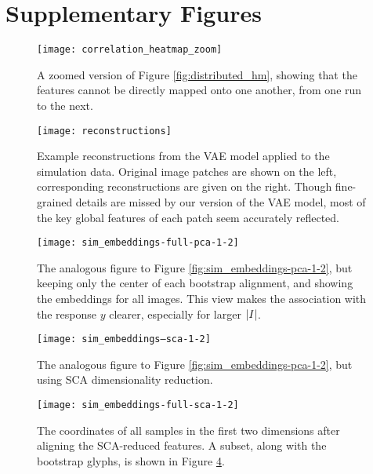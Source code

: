 \section{Supplementary Figures}

\begin{figure}
\texttt{[image: correlation\_heatmap\_zoom]}
\caption{A zoomed version of Figure \ref{fig:distributed_hm}, showing that the
  features cannot be directly mapped onto one another, from one run to the
  next.}
\label{fig:distributed_hm_subset}
\end{figure}

\begin{figure}
\texttt{[image: reconstructions]}
\caption{Example reconstructions from the VAE model applied to the simulation
  data. Original image patches are shown on the left, corresponding
  reconstructions are given on the right. Though fine-grained details are missed
  by our version of the VAE model, most of the key global features of each patch
  seem accurately reflected.}
\label{fig:reconstructions}
\end{figure}

\begin{figure}
  \centering
  \texttt{[image: sim\_embeddings-full-pca-1-2]}
  \caption{The analogous figure to Figure \ref{fig:sim_embeddings-pca-1-2}, but
    keeping only the center of each bootstrap alignment, and showing the
    embeddings for all images. This view makes the association with the response
    $y$ clearer, especially for larger $\left|I\right|$.}
  \label{fig:sim_embeddings-full-pca-1-2}
\end{figure}

\begin{figure}
  \centering
  \texttt{[image: sim\_embeddings--sca-1-2]}
  \caption{The analogous figure to Figure \ref{fig:sim_embeddings-pca-1-2}, but
    using SCA dimensionality reduction.}
  \label{fig:sim_embeddings--sca-1-2}
\end{figure}

\begin{figure}
  \centering
  \texttt{[image: sim\_embeddings-full-sca-1-2]}
  \caption{The coordinates of all samples in the first two dimensions after
    aligning the SCA-reduced features. A subset, along with the bootstrap
    glyphs, is shown in Figure \ref{fig:sim_embeddings--sca-1-2}.}
  \label{sim_embeddings-full-sca-1-2}
\end{figure}

